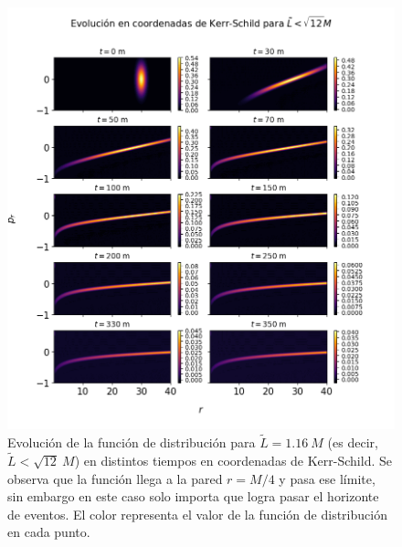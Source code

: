 \documentclass[11pt,twoside,openright,spanish]{report}
\numberwithin{equation}{chapter}
\numberwithin{figure}{chapter}
\numberwithin{table}{chapter}
\begin{document}
\newpage
\begin{figure}[H]
	\centering
	\includegraphics[width=\textwidth,height=\textheight,keepaspectratio]{graphs_study/LmenorKSGraphs/evolutionKSMenor.png}
	\caption{Evolución de la función de distribución para $\tilde{L}=1.16\ M$ (es decir, $\tilde{L}<\sqrt{12}\ M$) en distintos tiempos en coordenadas de Kerr-Schild. Se observa que la función llega a la pared $r=M/4$ y pasa ese límite, sin embargo en este caso solo importa que logra pasar el horizonte de eventos. El color representa el valor de la función de distribución en cada punto.}
	\label{evolutionLmenorKS}
\end{figure}
\end{document}
